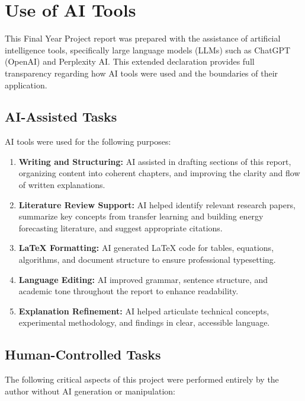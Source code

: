 \documentclass[12pt,a4paper]{report}
\begin{document}
\section{Use of AI Tools}

This Final Year Project report was prepared with the assistance of artificial intelligence tools, specifically large language models (LLMs) such as ChatGPT (OpenAI) and Perplexity AI. This extended declaration provides full transparency regarding how AI tools were used and the boundaries of their application.

\subsection{AI-Assisted Tasks}

AI tools were used for the following purposes:

\begin{enumerate}
    \item \textbf{Writing and Structuring:} AI assisted in drafting sections of this report, organizing content into coherent chapters, and improving the clarity and flow of written explanations.
    
    \item \textbf{Literature Review Support:} AI helped identify relevant research papers, summarize key concepts from transfer learning and building energy forecasting literature, and suggest appropriate citations.
    
    \item \textbf{LaTeX Formatting:} AI generated LaTeX code for tables, equations, algorithms, and document structure to ensure professional typesetting.
    
    \item \textbf{Language Editing:} AI improved grammar, sentence structure, and academic tone throughout the report to enhance readability.
    
    \item \textbf{Explanation Refinement:} AI helped articulate technical concepts, experimental methodology, and findings in clear, accessible language.
\end{enumerate}

\subsection{Human-Controlled Tasks}

The following critical aspects of this project were performed entirely by the author without AI generation or manipulation:
\end{document}
